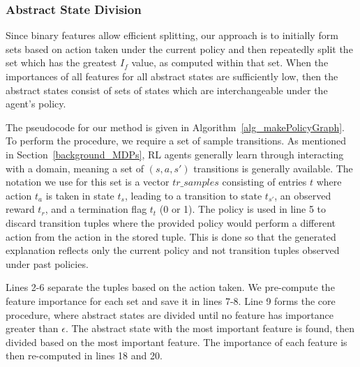 \documentclass[letterpaper]{article} %
\begin{document}
\subsubsection{Abstract State Division}
Since binary features allow efficient splitting, our approach is to initially form sets based on action taken under the current policy and then repeatedly split the set which has the greatest $I_f$ value, as computed within that set. When the importances of all features for all abstract states are sufficiently low, then the abstract states consist of sets of states which are interchangeable under the agent's policy. 

The pseudocode for our method is given in Algorithm~\ref{alg_makePolicyGraph}. To perform the procedure, we require a set of sample transitions. As mentioned in Section~\ref{background_MDPs}, RL agents generally learn through interacting with a domain, meaning a set of $(s,a,s')$ transitions is generally available. The notation we use for this set is a vector $tr\_samples$ consisting of entries $t$ where action $t_a$ is taken in state $t_s$, leading to a transition to state $t_{s'}$, an observed reward $t_r$, and a termination flag $t_t$ (0 or 1). The policy is used in line 5 to discard transition tuples where the provided policy would perform a different action from the action in the stored tuple. This is done so that the generated explanation reflects only the current policy and not transition tuples observed under past policies.

Lines 2-6 separate the tuples based on the action taken. We pre-compute the feature importance for each set and save it in lines 7-8. Line 9 forms the core procedure, where abstract states are divided until no feature has importance greater than $\epsilon$. The abstract state with the most important feature is found, then divided based on the most important feature. The importance of each feature is then re-computed in lines 18 and 20.
\end{document}
